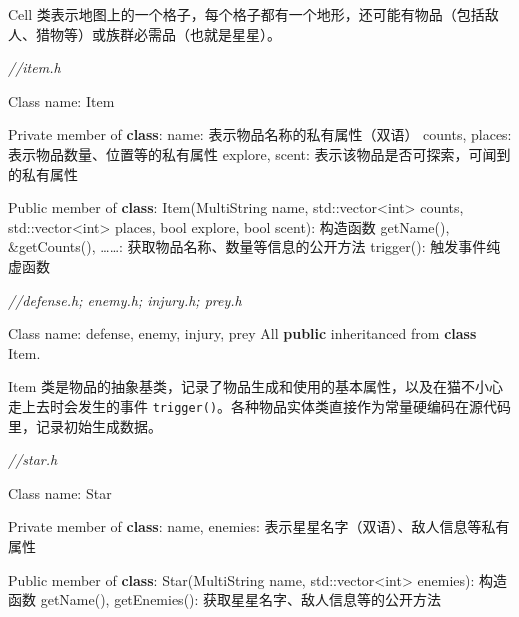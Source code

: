 \documentclass[hyperref,UTF8,a4paper]{ctexart}
\newenvironment{Shaded}{}{}
\newcommand{\BuiltInTok}[1]{#1}
\newcommand{\CommentTok}[1]{\textcolor[rgb]{0.38,0.63,0.69}{\textit{#1}}}
\newcommand{\DataTypeTok}[1]{\textcolor[rgb]{0.56,0.13,0.00}{#1}}
\newcommand{\KeywordTok}[1]{\textcolor[rgb]{0.00,0.44,0.13}{\textbf{#1}}}
\newcommand{\NormalTok}[1]{#1}
\begin{document}
Cell
类表示地图上的一个格子，每个格子都有一个地形，还可能有物品（包括敌人、猎物等）或族群必需品（也就是星星）。

\begin{Shaded}
\begin{Highlighting}[]
\CommentTok{//item.h}

\NormalTok{Class name: Item}

\NormalTok{Private member of }\KeywordTok{class}\NormalTok{:}
\NormalTok{    name: 表示物品名称的私有属性（双语）}
\NormalTok{    counts, places: 表示物品数量、位置等的私有属性}
\NormalTok{    explore, scent: 表示该物品是否可探索，可闻到的私有属性}

\NormalTok{Public member of }\KeywordTok{class}\NormalTok{:}
\NormalTok{    Item(MultiString name, }\BuiltInTok{std::}\NormalTok{vector<}\DataTypeTok{int}\NormalTok{> counts, }\BuiltInTok{std::}\NormalTok{vector<}\DataTypeTok{int}\NormalTok{> places, }\DataTypeTok{bool}\NormalTok{ explore, }\DataTypeTok{bool}\NormalTok{ scent): 构造函数}
\NormalTok{    getName(), &getCounts(), ……: 获取物品名称、数量等信息的公开方法}
\NormalTok{    trigger(): 触发事件纯虚函数}
        
\CommentTok{//defense.h; enemy.h; injury.h; prey.h}
        
\NormalTok{Class name: defense, enemy, injury, prey}
\NormalTok{All }\KeywordTok{public}\NormalTok{ inheritanced from }\KeywordTok{class}\NormalTok{ Item.}
\end{Highlighting}
\end{Shaded}

Item
类是物品的抽象基类，记录了物品生成和使用的基本属性，以及在猫不小心走上去时会发生的事件
\texttt{trigger()}。各种物品实体类直接作为常量硬编码在源代码里，记录初始生成数据。

\begin{Shaded}
\begin{Highlighting}[]
\CommentTok{//star.h}

\NormalTok{Class name: Star}

\NormalTok{Private member of }\KeywordTok{class}\NormalTok{:}
\NormalTok{    name, enemies: 表示星星名字（双语）、敌人信息等私有属性}

\NormalTok{Public member of }\KeywordTok{class}\NormalTok{:}
\NormalTok{    Star(MultiString name, }\BuiltInTok{std::}\NormalTok{vector<}\DataTypeTok{int}\NormalTok{> enemies): 构造函数}
\NormalTok{    getName(), getEnemies(): 获取星星名字、敌人信息等的公开方法}
\end{Highlighting}
\end{Shaded}
\end{document}

